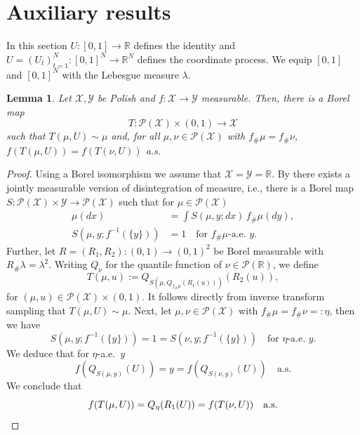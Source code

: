 \documentclass[a4paper]{amsart}
\numberwithin{theorem}{section}
\newtheorem{lemma}[theorem]{Lemma}
\theoremstyle{definition}
\newcommand{\R}{\mathbb{R}}
\newcommand{\Pc}{\mathcal P}
\begin{document}
\appendix

\section{Auxiliary results}\label{sec:app}
In this section $U : [0,1] \to \R$ defines the identity and $U = (U_t)_{t=1}^N : [0,1]^N \to \R^N$ defines the coordinate process. We equip $[0,1]$ and $[0,1]^N$ with the Lebesgue measure $\lambda$. 


\begin{lemma} \label{lem:funny.disint}
    Let $\mathcal X, \mathcal Y$ be Polish and $f : \mathcal X \to \mathcal Y$ measurable.
    Then, there is a Borel map
    \[
        T : \mathcal P(\mathcal X) \times (0,1) \to \mathcal X
    \]
    such that $T(\mu,U) \sim \mu$ and, for all $\mu,\nu \in \Pc(\mathcal X)$ with $f_\# \mu = f_\# \nu$, $f(T(\mu,U))= f(T(\nu,U))$ a.s.
\end{lemma}

\begin{proof}
    Using a Borel isomorphism we assume that $\mathcal X = \mathcal Y = \R$.
    By \cite[Lemma B.1]{La20}  there exists a jointly measurable version of disintegration of measure, i.e., there is a Borel map $S : \Pc(\mathcal X) \times \mathcal Y \to \Pc(\mathcal X)$ such that for $\mu \in \Pc(\mathcal X)$
    \begin{align*}
        \mu(dx) &= \int S(\mu,y;dx) \, f_\# \mu(dy), \\
        S(\mu,y;f^{-1}(\{y\})) &= 1 \quad \text{for } f_\# \mu\text{-a.e.\ $y$}.
    \end{align*}
    Further, let $R = (R_1,R_2) : (0,1) \to (0,1)^2$ be Borel measurable with $R_\# \lambda = \lambda^2$.
    Writing $Q_\nu$ for the quantile function of $\nu \in \mathcal P(\R)$, we define
    \[
        T(\mu,u) := Q_{S(\mu,Q_{f_\# \mu}(R_1(u)))}(R_2(u)),
    \]
    for $(\mu,u) \in \Pc(\mathcal X) \times (0,1)$.
    It follows directly from inverse transform sampling that $T(\mu,U) \sim \mu$.
    Next, let $\mu,\nu \in \mathcal P(\mathcal X)$ with $f_\# \mu = f_\# \nu =: \eta$, then we have
    \[
        S(\mu,y;f^{-1}(\{y\})) = 1 = S(\nu,y;f^{-1}(\{y\})) \quad \text{for } \eta\text{-a.e.\ $y$.}
    \]
    We deduce that for $\eta$-a.e.\ $y$
    \[
        f(Q_{S(\mu,y)}(U)) = y = f(Q_{S(\nu,y)}(U))\quad\text{a.s.}
    \]
    We conclude that
    \[
        f(T(\mu,U)) = Q_\eta(R_1(U)) = f(T(\nu,U)) \quad \text{a.s.} \qedhere
    \]
\end{proof}
\end{document}
